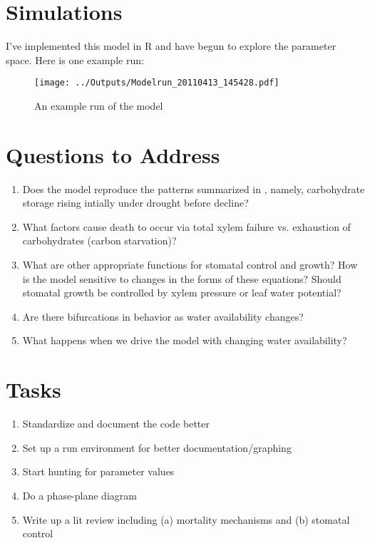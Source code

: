 \documentclass[12pt]{amsart}
\begin{document}
\section{Simulations}
I've implemented this model in R and have begun to explore the parameter space.  Here is one example run:

\begin{figure}[H]
\begin{center}
\texttt{[image: ../Outputs/Modelrun\_20110413\_145428.pdf]}
\caption{An example run of the model}
\label{example1}
\end{center}
\end{figure}


\section{Questions to Address}
 
\begin{enumerate}
  \item Does the model reproduce the patterns summarized in \citet{McDowell2011}, namely, carbohydrate storage rising intially under drought before decline?
  \item What factors cause death to occur via total xylem failure vs. exhaustion of carbohydrates (carbon starvation)?
  \item What are other appropriate functions for stomatal control and growth?  How is the model sensitive to changes in the forms of these equations?  Should stomatal growth be controlled by xylem pressure or leaf water potential?
  \item Are there bifurcations in behavior as water availability changes?
  \item What happens when we drive the model with changing water availability?
\end{enumerate}
  
\section{Tasks}
\begin{enumerate}
  \item Standardize and document the code better
  \item Set up a run environment for better documentation/graphing
  \item Start hunting for parameter values
  \item Do a phase-plane diagram
  \item Write up a lit review including (a) mortality mechanisms and (b) stomatal control
\end{enumerate}



\end{document}
